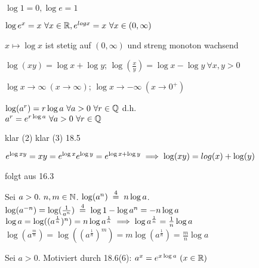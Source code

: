 \documentclass[a4paper,twoside,DIV15,BCOR12mm]{scrbook}
\begin{document}
\begin{eigenschaften}


\begin{liste}
\item $\log 1 = 0, \log e = 1$
\item $\log e^x = x\ \forall x \in \mathbb{R}, e^{log x}=x\ \forall x \in (0, \infty)$
\item $x \mapsto \log x$ ist stetig auf $(0, \infty)$ und streng monoton wachsend
\item $\log(xy) = \log x + \log y$; $\log(\frac{x}{y})=\log x - \log y\ \forall x,y > 0$
\item $\log x \to \infty\ (x \to \infty)$; $\log x \to -\infty\ (x \to 0^+)$
\item $\log(a^r) = r \log a\ \forall a > 0\ \forall r \in \MdQ$ d.h.\\
$a^r = e^{r \log a}\ \forall a > 0\ \forall r \in \mathbb{Q}$
\end{liste}

\begin{beweise}
\item klar (2) klar (3) 18.5
\setcounter{enumi}{3}
\item $e^{\log{xy}}=xy = e^{\log x}e^{\log y}=e^{\log x + \log y} \implies \log(xy) = log(x) + \log(y)$
\item folgt aus 16.3
\item Sei $a>0.\ n, m \in \mathbb{N}$. $\log(a^n) \gleichwegen{4} n \log a$. $\log(a^{-n})=\log(\frac{1}{a^n}) \gleichwegen{4} \log 1 - \log a^n = -n \log a$\\
$\log a = \log((a^\frac{1}{n})^n)=n \log a^\frac{1}{n} \implies \log a^\frac{1}{n}=\frac{1}{n} \log a$\\
$\log(a^\frac{m}{n}) = \log((a^{\frac{1}{n}})^m) = m \log(a^{\frac{1}{n}})=\frac{m}{n}\log a$
\end{beweise}

\end{eigenschaften}

\begin{definition}
Sei $a>0$. Motiviert durch 18.6(6): $a^x = e^{x\log a}\ (x\in\MdR)$
\end{definition}
\end{document}
